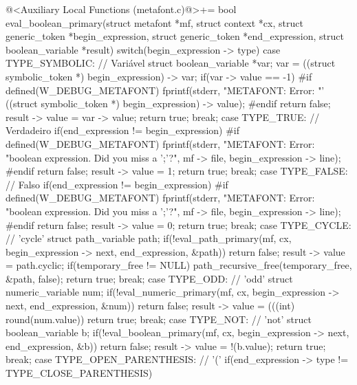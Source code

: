 {{{{{\iniciocodigo
@<Auxiliary Local Functions (metafont.c)@>+=
bool eval_boolean_primary(struct metafont *mf, struct context *cx,
                          struct generic_token *begin_expression,
                          struct generic_token *end_expression,
                          struct boolean_variable *result){
  switch(begin_expression -> type){
    case TYPE_SYMBOLIC: // Variável
      struct boolean_variable *var;
      var = ((struct symbolic_token *) begin_expression) -> var;
      if(var -> value == -1){
#if defined(W_DEBUG_METAFONT)
        fprintf(stderr, "METAFONT: Error: %
                "'%
                ((struct symbolic_token *) begin_expression) -> value);
#endif
        return false;
      }
      result -> value = var -> value;
      return true;
    break;
    case TYPE_TRUE: // Verdadeiro
      if(end_expression != begin_expression){
#if defined(W_DEBUG_METAFONT)
        fprintf(stderr, "METAFONT: Error: %
                "boolean expression. Did you miss a ';'?\n",
                mf -> file, begin_expression -> line);
#endif
        return false;
      }
      result -> value = 1;
      return true;
    break;
    case TYPE_FALSE: // Falso
      if(end_expression != begin_expression){
#if defined(W_DEBUG_METAFONT)
        fprintf(stderr, "METAFONT: Error: %
                "boolean expression. Did you miss a ';'?\n",
                mf -> file, begin_expression -> line);
#endif
        return false;
      }
      result -> value = 0;
      return true;
    break;
    case TYPE_CYCLE: // 'cycle'
      struct path_variable path;
      if(!eval_path_primary(mf, cx, begin_expression -> next, end_expression,
                            &path))
        return false;
      result -> value = path.cyclic;
      if(temporary_free != NULL)
        path_recursive_free(temporary_free, &path, false);
      return true;
    break;
    case TYPE_ODD: // 'odd'
      struct numeric_variable num;
      if(!eval_numeric_primary(mf, cx, begin_expression -> next, end_expression,
                               &num))
        return false;
      result -> value = (((int) round(num.value)) %
      return true;
    break;
    case TYPE_NOT: // 'not'
      struct boolean_variable b;
      if(!eval_boolean_primary(mf, cx, begin_expression -> next, end_expression,
                              &b))
        return false;
      result -> value = !(b.value);
      return true;
    break;
    case TYPE_OPEN_PARENTHESIS: // '('
      if(end_expression -> type != TYPE_CLOSE_PARENTHESIS){
}}}}}}}}
